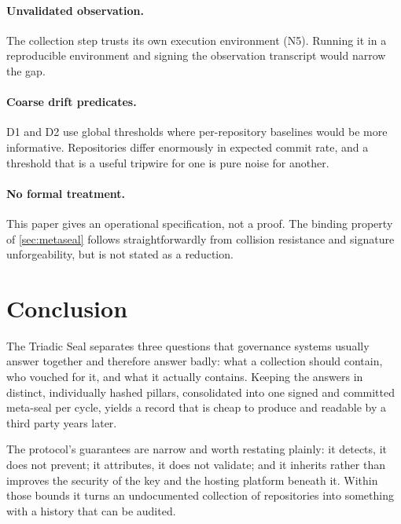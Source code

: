 \documentclass[11pt,a4paper]{article}
\begin{document}
\paragraph{Unvalidated observation.}
The collection step trusts its own execution environment (N5). Running it in
a reproducible environment and signing the observation transcript would
narrow the gap.

\paragraph{Coarse drift predicates.}
D1 and D2 use global thresholds where per-repository baselines would be more
informative. Repositories differ enormously in expected commit rate, and a
threshold that is a useful tripwire for one is pure noise for another.

\paragraph{No formal treatment.}
This paper gives an operational specification, not a proof. The binding
property of \cref{sec:metaseal} follows straightforwardly from collision
resistance and signature unforgeability, but is not stated as a reduction.

\section{Conclusion}

The Triadic Seal separates three questions that governance systems usually
answer together and therefore answer badly: what a collection should contain,
who vouched for it, and what it actually contains. Keeping the answers in
distinct, individually hashed pillars, consolidated into one signed and
committed meta-seal per cycle, yields a record that is cheap to produce and
readable by a third party years later.

The protocol's guarantees are narrow and worth restating plainly: it detects,
it does not prevent; it attributes, it does not validate; and it inherits
rather than improves the security of the key and the hosting platform beneath
it. Within those bounds it turns an undocumented collection of repositories
into something with a history that can be audited.



\end{document}
